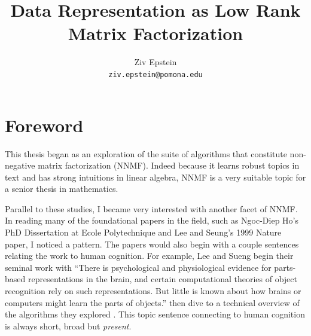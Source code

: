 \documentclass[12pt]{pom_thesis}
\begin{document}
\nocite{*}

\title{Data Representation as Low Rank Matrix Factorization}


\author{Ziv Epstein \\ 
	\texttt{ziv.epstein@pomona.edu}}
\maketitle
{}
\tableofcontents
\newpage


	\newpage
\section*{Foreword}
This thesis began as an exploration of the suite of algorithms that constitute non-negative matrix factorization (NNMF). Indeed because it learns robust topics in text and has strong intuitions in linear algebra, NNMF is a very suitable topic for a senior thesis in mathematics. 

Parallel to these studies, I became very interested with another facet of NNMF. In reading many of the foundational papers in the field, such as Ngoc-Diep Ho's PhD Dissertation at Ecole Polytechnique and Lee and Seung's 1999 Nature paper, I noticed a pattern. The papers would also begin with a couple sentences relating the work to human cognition. For example, Lee and Sueng begin their seminal work with ``There
is psychological and physiological evidence for parts-based representations in the brain, and certain computational theories of object recognition rely on such representations. But little is known about how brains or computers might learn the parts of objects.'' then dive to a technical overview of the algorithms they explored \cite{lee1999learning}. This topic sentence connecting to human cognition is always short, broad but \textit{present}.
\end{document}
